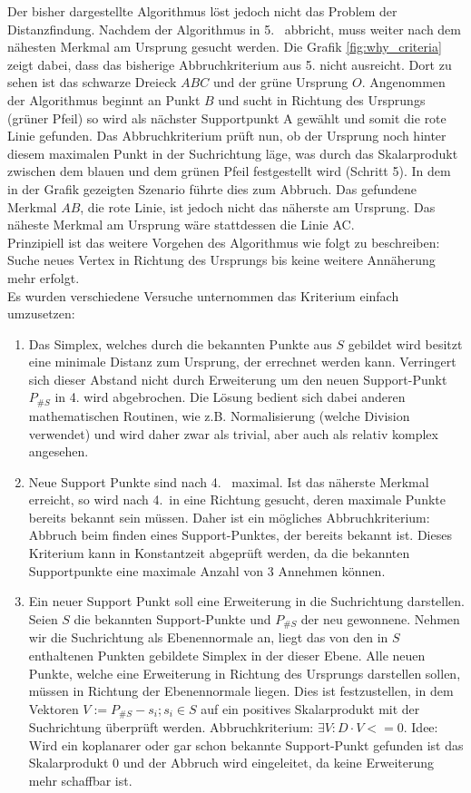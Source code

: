 Der bisher dargestellte Algorithmus löst jedoch nicht das Problem der Distanzfindung. Nachdem der Algorithmus in 5.~ abbricht, muss weiter nach dem nähesten Merkmal am Ursprung gesucht werden. Die Grafik \ref{fig:why_criteria} zeigt dabei, dass das bisherige Abbruchkriterium aus 5. nicht ausreicht.
Dort zu sehen ist das schwarze Dreieck $ABC$ und der grüne Ursprung $O$. Angenommen der Algorithmus beginnt an Punkt $B$ und sucht in Richtung des Ursprungs (grüner Pfeil) so wird als nächster Supportpunkt A gewählt und somit die rote Linie gefunden. Das Abbruchkriterium prüft nun, ob der Ursprung noch hinter diesem maximalen Punkt in der Suchrichtung läge, was durch das Skalarprodukt zwischen dem blauen und dem grünen Pfeil festgestellt wird (Schritt 5). In dem in der Grafik gezeigten Szenario führte dies zum Abbruch. Das gefundene Merkmal $AB$, die rote Linie, ist jedoch nicht das näherste am Ursprung. Das näheste Merkmal am Ursprung wäre stattdessen die Linie AC.\\
Prinzipiell ist das weitere Vorgehen des Algorithmus wie folgt zu beschreiben:\\
Suche neues Vertex in Richtung des Ursprungs bis keine weitere Annäherung mehr erfolgt.\\
Es wurden verschiedene Versuche unternommen das Kriterium einfach umzusetzen:
\begin{enumerate}
	\item Das Simplex, welches durch die bekannten Punkte aus $S$ gebildet wird besitzt eine minimale Distanz zum Ursprung, der errechnet werden kann. Verringert sich dieser Abstand nicht durch Erweiterung um den neuen Support-Punkt $P_{\#S}$ in 4. wird abgebrochen. Die Lösung bedient sich dabei anderen mathematischen Routinen, wie z.B. Normalisierung (welche Division verwendet) und wird daher zwar als trivial, aber auch als relativ komplex angesehen.
	\item Neue Support Punkte sind nach 4.~ maximal. Ist das näherste Merkmal erreicht, so wird nach 4.~in eine Richtung gesucht, deren maximale Punkte bereits bekannt sein müssen. Daher ist ein mögliches Abbruchkriterium: Abbruch beim finden eines Support-Punktes, der bereits bekannt ist. Dieses Kriterium kann in Konstantzeit abgeprüft werden, da die bekannten Supportpunkte eine maximale Anzahl von 3 Annehmen können.
	\item Ein neuer Support Punkt soll eine Erweiterung in die Suchrichtung darstellen. Seien $S$ die bekannten Support-Punkte und $P_{\#S}$ der neu gewonnene. Nehmen wir die Suchrichtung als Ebenennormale an, liegt das von den in $S$ enthaltenen Punkten gebildete Simplex in der dieser Ebene. Alle neuen Punkte, welche eine Erweiterung in Richtung des Ursprungs darstellen sollen, müssen in Richtung der Ebenennormale liegen. Dies ist festzustellen, in dem Vektoren $V := P_{\#S}-s_i ; s_i\in S$ auf ein positives Skalarprodukt mit der Suchrichtung überprüft werden. Abbruchkriterium: $\exists V : D \cdot V <= 0$. Idee: Wird ein koplanarer oder gar schon bekannte Support-Punkt gefunden ist das Skalarprodukt $0$ und der Abbruch wird eingeleitet, da keine Erweiterung mehr schaffbar ist.
\end{enumerate}
